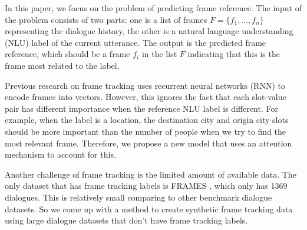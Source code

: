 In this paper, we focus on the problem of predicting frame reference. The input of the problem consists of two parts: one is a list of frames $F = \{f_1,\dotsc,f_n\}$ representing the dialogue history, the other is a natural language understanding (NLU) label of the current utterance. The output is the predicted frame reference, which should be a frame $f_i$ in the list $F$ indicating that this is the frame most related to the label.

Previous research \cite{schulz2017frame} on frame tracking uses recurrent neural networks (RNN) to encode frames into vectors. However, this ignores the fact that each slot-value pair has different importance when the reference NLU label is different. For example, when the label is a location, the destination city and origin city slots should be more important than the number of people when we try to find the most relevant frame. Therefore, we propose a new model that uses an attention mechanism to account for this.

Another challenge of frame tracking is the limited amount of available data. The only dataset that has frame tracking labels is FRAMES \cite{asri2017frames}, which only has 1369 dialogues. This is relatively small comparing to other benchmark dialogue datasets. So we come up with a method to create synthetic frame tracking data using large dialogue datasets that don't have frame tracking labels.

